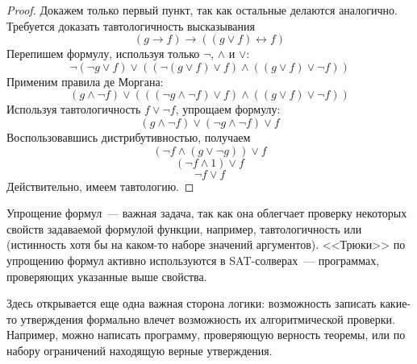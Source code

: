 \begin{proof}
    Докажем только первый пункт, так как остальные делаются аналогично.
    Требуется доказать тавтологичность высказывания
    \[
        (g \rightarrow f) \rightarrow ((g \vee f) \leftrightarrow f)
    \]
    Перепишем формулу, используя только $ \neg $, $ \wedge $ и $ \vee $:
    \[
        \neg (\neg g \vee f) \vee ((\neg (g \vee f) \vee f) \wedge ((g \vee f) \vee \neg f))
    \]
    Применим правила де Моргана:
    \[
        (g \wedge \neg f) \vee (((\neg g \wedge \neg f) \vee f) \wedge ((g \vee f) \vee \neg f))
    \]
    Используя тавтологичность $ f \vee \neg f $, упрощаем формулу:
    \[
        (g \wedge \neg f) \vee (\neg g \wedge \neg f) \vee f
    \]
    Воспользовавшись дистрибутивностью, получаем
    \[
        (\neg f \wedge (g \vee \neg g)) \vee f
    \]
    \[
        (\neg f \wedge 1) \vee f
    \]
    \[
        \neg f \vee f
    \]
    Действительно, имеем тавтологию.
\end{proof}

Упрощение формул~--- важная задача, так как она облегчает проверку некоторых свойств задаваемой формулой функции, например,
тавтологичность или  (истинность хотя бы на каком-то наборе значений аргументов).
<<Трюки>> по упрощению формул активно используются в SAT-солверах~--- программах, проверяющих указанные выше свойства.

Здесь открывается еще одна важная сторона логики: возможность записать какие-то утверждения формально влечет возможность их алгоритмической проверки.
Например, можно написать программу, проверяющую верность теоремы, или по набору ограничений находящую верные утверждения.

